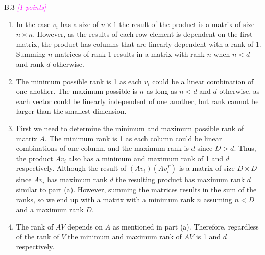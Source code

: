 \documentclass{article}
\newcommand{\1}{\mathbf{1}}
\newcommand{\points}[1]{\small\textcolor{magenta}{\emph{[#1 points]}} \normalsize}
\begin{document}
B.3 \points{1} 
    \begin{enumerate}
        \item In the case $v_i$ has a size of $n\times 1$ the result of the product is a matrix of size $n\times n$. However, as the results of each row element is dependent on the first matrix, the product has columns that are linearly dependent with a rank of 1. Summing $n$ matrices of rank 1 results in a matrix with rank $n$ when $n<d$ and rank $d$ otherwise. 
        \item The minimum possible rank is 1 as each $v_i$ could be a linear combination of one another. The maximum possible is $n$ as long as $n< d$ and $d$ otherwise, as each vector could be linearly independent of one another, but rank cannot be larger than the smallest dimension. 
        \item First we need to determine the minimum and maximum possible rank of matrix $A$. The minimum rank is 1 as each column could be linear combinations of one column, and the maximum rank is $d$ since $D>d$. Thus, the product $Av_i$ also has a minimum and maximum rank of 1 and $d$ respectively. Although the result of $(Av_i)(Av_i^T)$ is a matrix of size $D\times D$ since $Av_i$ has maximum rank $d$ the resulting product has maximum rank $d$ similar to part (a). However, summing the matrices results in the sum of the ranks, so we end up with a matrix with a minimum rank $n$ assuming $n<D$ and a maximum rank $D$.   
        \item The rank of $AV$ depends on $A$ as mentioned in part (a). Therefore, regardless of the rank of $V$ the minimum and maximum rank of $AV$ is 1 and $d$ respectively. 
    \end{enumerate}
\end{document}
